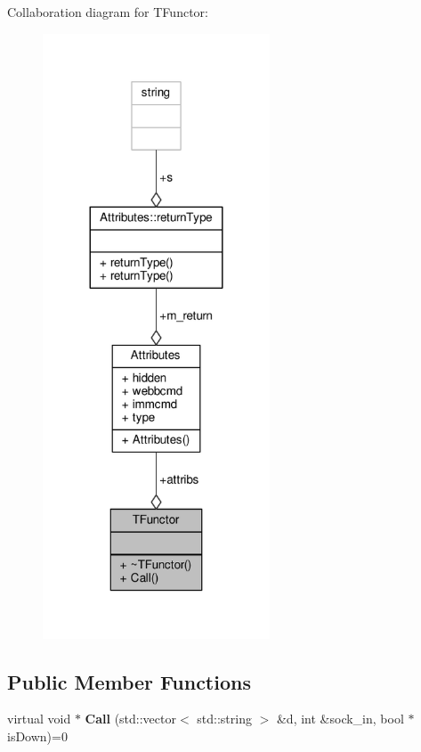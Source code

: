 Collaboration diagram for T\+Functor\+:
\nopagebreak
\begin{figure}[H]
\begin{center}
\leavevmode
\includegraphics[width=191pt]{db/db5/classTFunctor__coll__graph}
\end{center}
\end{figure}
\subsection*{Public Member Functions}
\begin{DoxyCompactItemize}
\item 
virtual void $\ast$ {\bfseries Call} (std\+::vector$<$ std\+::string $>$ \&d, int \&sock\+\_\+in, bool $\ast$is\+Down)=0\hypertarget{classTFunctor_aba774662ddcf91c6cc07a5c54d900811}{}\label{classTFunctor_aba774662ddcf91c6cc07a5c54d900811}

\end{DoxyCompactItemize}
